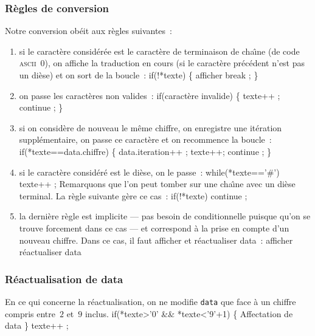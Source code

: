 \begin{correction}
\subsubsection*{R\`egles de conversion}
Notre conversion ob\'eit aux r\`egles suivantes~:
\begin{enumerate}
\item si le caract\`ere consid\'er\'ee est le caract\`ere de terminaison
de cha\^\i{}ne (de code \textsc{ascii}~$0$), on affiche la traduction en cours (si le caract\`ere pr\'ec\'edent n'est pas un di\`ese) et
on sort de la boucle~:
\nwenddocs{}\endmoddef
if(!*texte)
\{ 
\LA{}afficher\RA{}
break ;
\}
\eatline
\nwendcode{}\nwdocspar
\nwenddocs{}\nwdocspar
\item on passe les caract\`eres non valides~:
\nwenddocs{}\plusendmoddef
if(\LA{}caract\`ere invalide\RA{})
\{
  texte++ ;
  continue ;
\}
\eatline
\nwendcode{}\nwdocspar
\item si on consid\`ere de nouveau le m\^eme chiffre, on enregistre une it\'eration
suppl\'ementaire, on passe ce caract\`ere et on recommence la boucle~:
\nwenddocs{}\plusendmoddef
if(*texte==data.chiffre)
\{
  data.iteration++ ;
  texte++;
  continue ;
\}
\nwendcode{}%
\nwenddocs{}\nwdocspar
\item si le caract\`ere consid\'er\'e est le di\`ese, on le passe~:
\nwenddocs{}\plusendmoddef
while(*texte=='#')
  texte++ ;
\eatline
\nwendcode{}\nwdocspar
Remarquons que l'on peut tomber sur une cha\^\i{}ne avec un di\`ese terminal.
La r\`egle suivante g\`ere ce cas~:
\nwenddocs{}\plusendmoddef
if(!*texte)
  continue ;
\eatline
\nwendcode{}\nwdocspar
\nwenddocs{}\nwdocspar
\item la derni\`ere r\`egle est implicite --- pas besoin de conditionnelle puisque qu'on 
se trouve forcement dans ce cas --- et correspond \`a la prise en compte 
d'un nouveau chiffre. Dans ce cas, il faut afficher et r\'eactualiser data~:
\nwenddocs{}\plusendmoddef
\LA{}afficher\RA{}
\LA{}r\'eactualiser data\RA{}
\eatline
\nwendcode{}\end{enumerate}

\nwenddocs{}\nwdocspar
\subsubsection*{R\'eactualisation de data}
En ce qui concerne la r\'eactualisation, on ne modifie {\tt{}data} que
face \`a un chiffre compris entre~$2$ et~$9$ inclus.
\nwenddocs{}\endmoddef
if(*texte>'0' && *texte<'9'+1)
\{
\LA{}Affectation de data\RA{}
\}
texte++ ;
\eatline
\nwendcode{}\nwdocspar
\end{correction}
\fi
\nwenddocs{}
